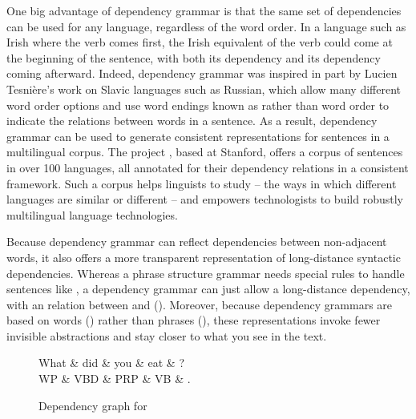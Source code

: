 One big advantage of dependency grammar is that the same set of dependencies can be used for any language, regardless of the word order.  In a language such as Irish where the verb comes first, the Irish equivalent of the verb  could come at the beginning of the sentence, with both its  dependency and its  dependency coming afterward.  Indeed, dependency grammar was inspired in part by Lucien Tesni\`ere's work on Slavic languages such as Russian, which allow many different word order options and use word endings known as  rather than word order to indicate the relations between words in a sentence.  As a result, dependency grammar can be used to generate consistent representations for sentences in a multilingual corpus.  The  project \citep{Nivre-etal:2016}, based at Stanford, offers a corpus of sentences in over 100 languages, all  annotated for their dependency relations in a consistent framework.  Such a corpus  helps linguists to study  -- the ways in which different languages are similar or different -- and empowers technologists to build robustly multilingual language technologies.



Because dependency grammar can reflect dependencies between non-adjacent words, it also offers a more transparent representation of long-distance syntactic dependencies.  Whereas a phrase structure grammar needs special rules to handle sentences like , a dependency grammar can just allow a long-distance dependency, with an  relation between  and  ().  Moreover, because dependency grammars are based on words () rather than phrases (), these representations invoke fewer invisible abstractions and stay closer to what you see in the text.
 
 
\begin{figure}
\begin{dependency}[theme = simple] %
   \begin{deptext}[column sep=1em]
    What \& did \& you \& eat \& ?\\
    WP \& VBD \& PRP \& VB \& .\\
   \end{deptext}
   \end{dependency}
   \caption{Dependency graph for }
   \label{fig:whateat}
\end{figure}



